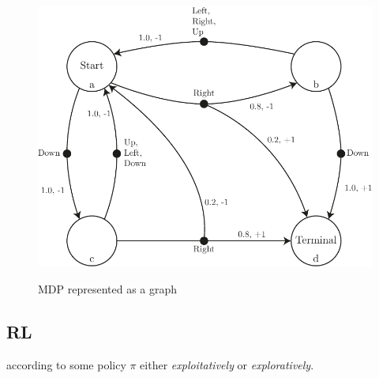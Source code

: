 \begin{figure}[!htb]
    \centering
    \includegraphics[scale=0.8]{../include/PDF/MDP.pdf}
    \caption{\todo}
    \label{fig:MDP}
\end{figure}

\begin{figure}[!htb]
    \centering
    \caption{MDP represented as a graph}
    \label{fig:mdp-graph-repr}
\end{figure}

\subsection{RL}
according to some policy $\pi$ either \textit{exploitatively} or \textit{exploratively}.
